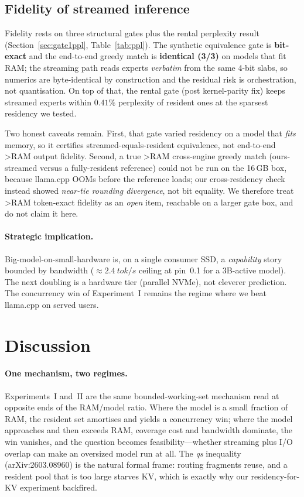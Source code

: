 \documentclass[11pt]{article}
\begin{document}
\subsection{Fidelity of streamed inference}
\label{sec:fidelity}
Fidelity rests on three structural gates plus the rental perplexity result
(Section~\ref{sec:gate1ppl}, Table~\ref{tab:ppl}). The synthetic equivalence gate is
\textbf{bit-exact} and the end-to-end greedy match is \textbf{identical (3/3)} on models
that fit RAM; the streaming path reads experts \emph{verbatim} from the same 4-bit slabs,
so numerics are byte-identical by construction and the residual risk is orchestration,
not quantisation. On top of that, the rental gate (post kernel-parity fix) keeps streamed
experts within $0.41\%$ perplexity of resident ones at the sparsest residency we tested.

Two honest caveats remain. First, that gate varied residency on a model that \emph{fits}
memory, so it certifies streamed-equals-resident equivalence, not end-to-end >RAM output
fidelity. Second, a true >RAM cross-engine greedy match (ours-streamed versus a
fully-resident reference) could not be run on the 16\,GB box, because llama.cpp OOMs
before the reference loads; our cross-residency check instead showed \emph{near-tie
rounding divergence}, not bit equality. We therefore treat >RAM token-exact fidelity as
an \emph{open} item, reachable on a larger gate box, and do not claim it here.

\paragraph{Strategic implication.} Big-model-on-small-hardware is, on a single consumer
SSD, a \emph{capability} story bounded by bandwidth (${\approx}\SI{2.4}{tok/s}$ ceiling
at pin~0.1 for a 3B-active model). The next doubling is a hardware tier (parallel NVMe),
not cleverer prediction. The concurrency win of Experiment~I remains the regime where we
beat llama.cpp on served users.

\section{Discussion}

\paragraph{One mechanism, two regimes.} Experiments~I and~II are the same bounded-working-set
mechanism read at opposite ends of the RAM/model ratio. Where the model is a small
fraction of RAM, the resident set amortises and yields a concurrency win; where the model
approaches and then exceeds RAM, coverage cost and bandwidth dominate, the win vanishes,
and the question becomes feasibility---whether streaming plus I/O overlap can make an
oversized model run at all. The \emph{qs} inequality (arXiv:2603.08960) is the natural
formal frame: routing fragments reuse, and a resident pool that is too large starves KV,
which is exactly why our residency-for-KV experiment backfired.
\end{document}
